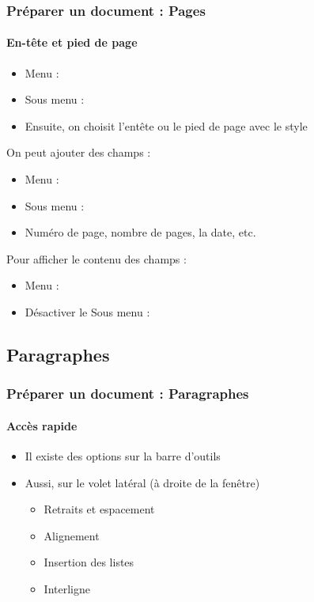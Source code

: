 \documentclass[xcolor=table]{beamer}
\begin{document}
\begin{frame}
\frametitle{Préparer un document : Pages}
\framesubtitle{En-tête et pied de page}

\begin{itemize}
	\item Menu :  
	\item Sous menu : 
	\item Ensuite, on choisit l'entête ou le pied de page avec le style
\end{itemize}

On peut ajouter des champs : 
\begin{itemize}
	\item Menu :  
	\item Sous menu : 
	\item Numéro de page, nombre de pages, la date, etc. 
\end{itemize}

Pour afficher le contenu des champs : 
\begin{itemize}
	\item Menu :  
	\item Désactiver le Sous menu :  
\end{itemize}

\end{frame}


\subsection{Paragraphes}

\begin{frame}
\frametitle{Préparer un document : Paragraphes}
\framesubtitle{Accès rapide}

\begin{minipage}{0.64\textwidth}
	\begin{itemize}
		\item Il existe des options sur la barre d'outils
		\item Aussi, sur le volet latéral (à droite de la fenêtre)
		\begin{itemize}
			\item Retraits et espacement 
			\item Alignement
			\item Insertion des listes
			\item Interligne
		\end{itemize}
	\end{itemize}


\end{minipage}
\begin{minipage}{0.35\textwidth}
	
\end{minipage}

\end{frame}
\end{document}
